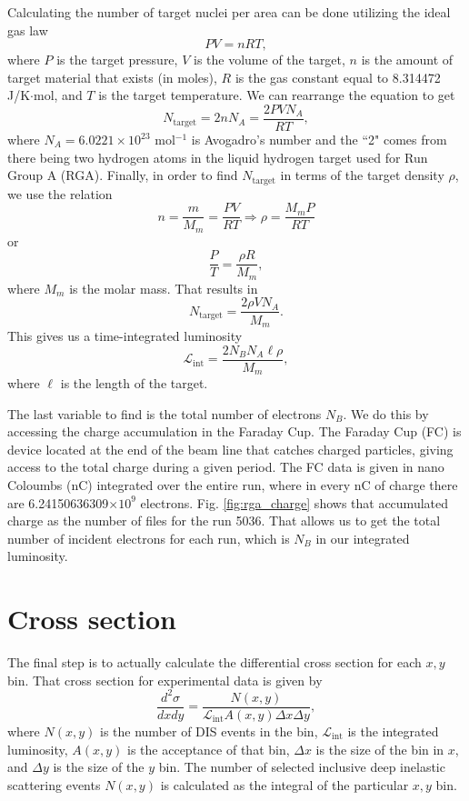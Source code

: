 Calculating the number of target nuclei per area can be done utilizing the ideal gas law
\begin{equation}
PV=nRT,
\end{equation}
where $P$ is the target pressure, $V$ is the volume of the target, $n$ is the amount of target material that exists (in moles), $R$ is the gas constant equal to 8.314472 J/K$\cdot$mol, and $T$ is the target temperature. We can rearrange the equation to get
\begin{equation}
N_{\mathrm{target}} = 2nN_A = \frac{2PVN_A}{RT},
\end{equation}
where $N_A = 6.0221 \times 10^{23}$ mol$^{-1}$ is Avogadro's number and the ``2" comes from there being two hydrogen atoms in the liquid hydrogen target used for Run Group A (RGA). Finally, in order to find $N_{\mathrm{target}}$ in terms of the target density $\rho$, we use the relation 
\begin{equation}
n = \frac{m}{M_m} = \frac{PV}{RT} \Rightarrow \rho = \frac{M_m P}{RT}
\end{equation}
or
\begin{equation}
\frac{P}{T} = \frac{\rho R}{M_m},
\end{equation}
where $M_m$ is the molar mass. That results in
\begin{equation}
N_{\mathrm{target}} = \frac{2\rho V N_A}{M_m}.
\end{equation} 
This gives us a time-integrated luminosity
\begin{equation}
\mathscr{L}_{\mathrm{int}} = \frac{2N_B N_A \ell \rho}{M_m},
\end{equation}
where $\ell$ is the length of the target.

The last variable to find is the total number of electrons $N_B$. We do this by accessing the charge accumulation in the Faraday Cup. The Faraday Cup (FC) is device located at the end of the beam line that catches charged particles, giving access to the total charge during a given period. The FC data is given in nano Coloumbs (nC) integrated over the entire run, where in every nC of charge there are 6.24150636309$\times 10^{9}$ electrons. Fig. \ref{fig:rga_charge} shows that accumulated charge as the number of files for the run 5036. That allows us to get the total number of incident electrons for each run, which is $N_B$ in our integrated luminosity.

\section{Cross section}
The final step is to actually calculate the differential cross section for each $x,y$ bin. That cross section for experimental data is given by
\begin{equation}
\frac{d^2\sigma}{dxdy} = \frac{N(x,y)}{\mathscr{L}_{\mathrm{int}}A(x,y)\Delta x \Delta y},
\end{equation}
where $N(x,y)$ is the number of DIS events in the bin, $\mathscr{L}_{\mathrm{int}}$ is the integrated luminosity, $A(x,y)$ is the acceptance of that bin, $\Delta x$ is the size of the bin in $x$, and $\Delta y$ is the size of the $y$ bin. The number of selected inclusive deep inelastic scattering events $N(x,y)$ is calculated as the integral of the particular $x,y$ bin.

